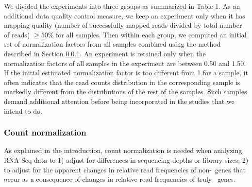 

We divided the experiments into three groups as summarized in Table 1.  As an
additional data quality control measure,  we keep an experiment only when it 
has mapping quality (number of successfully mapped reads divided by total number of reads) $\geq 
50\%$ for all samples.
Then within each group, we computed an
initial set of normalization factors from all samples combined using the method
described in Section \ref{section:countNormalization}.  An experiment is
retained only when the normalization factors of all samples in the experiment
are between 0.50 and 1.50.  If the initial estimated normalization factor is
too different from 1 for a sample, it often indicates that the read counts
distribution in the corresponding sample is markedly different from the
distributions of the rest of the samples. Such samples demand additional
attention before being incorporated in the studies that we intend to do.



\subsubsection{Count normalization}\label{section:countNormalization}
As explained in the introduction, count normalization is needed when analyzing RNA-Seq data to
1) adjust for differences in sequencing depths or
library sizes; 2) to adjust for the apparent changes in relative read
frequencies of non-\DED~genes that occur as a consequence of changes in relative read frequencies 
of truly \DED~genes.

